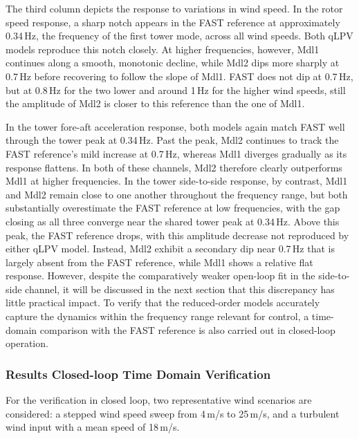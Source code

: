 {The third column depicts the response to variations in wind speed. In the rotor speed response, a sharp notch appears in the FAST reference at approximately 0.34\,Hz, the frequency of the first tower mode, across all wind speeds. Both qLPV models reproduce this notch closely. At higher frequencies, however, Mdl1 continues along a smooth, monotonic decline, while Mdl2 dips more sharply at 0.7\,Hz before recovering to follow the slope of Mdl1. FAST does not dip at 0.7\,Hz, but at 0.8\,Hz for the two lower and around 1\,Hz for the higher wind speeds, still the amplitude of Mdl2 is closer to this reference than the one of Mdl1.

In the tower fore-aft acceleration response, both models again match FAST well through the tower peak at 0.34\,Hz. Past the peak, Mdl2 continues to track the FAST reference's mild increase at 0.7\,Hz, whereas Mdl1 diverges gradually as its response flattens. In both of these channels, Mdl2 therefore clearly outperforms Mdl1 at higher frequencies. In the tower side-to-side response, by contrast, Mdl1 and Mdl2 remain close to one another throughout the frequency range, but both substantially overestimate the FAST reference at low frequencies, with the gap closing as all three converge near the shared tower peak at 0.34\,Hz. Above this peak, the FAST reference drops, with this amplitude decrease not reproduced by either qLPV model. Instead, Mdl2 exhibit a secondary dip near 0.7\,Hz that is largely absent from the FAST reference, while Mdl1 shows a relative flat response. However, despite the comparatively weaker open-loop fit in the side-to-side channel, it will be discussed in the next section that this discrepancy has little practical impact. To verify that the reduced-order models accurately capture the dynamics within the frequency range relevant for control, a time-domain comparison with the FAST reference is also carried out in closed-loop operation. 


\subsubsection*{Results Closed-loop Time Domain Verification}    
For the verification in closed loop, two representative wind scenarios are considered: a stepped wind speed sweep from 4\,m/s to 25\,m/s, and a turbulent wind input with a mean speed of 18\,m/s.

}
